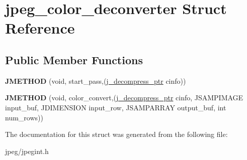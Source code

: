 \hypertarget{structjpeg__color__deconverter}{}\section{jpeg\+\_\+color\+\_\+deconverter Struct Reference}
\label{structjpeg__color__deconverter}
\subsection*{Public Member Functions}
\begin{DoxyCompactItemize}
\item 
{\bfseries J\+M\+E\+T\+H\+OD} (void, start\+\_\+pass,(\hyperlink{structjpeg__decompress__struct}{j\+\_\+decompress\+\_\+ptr} cinfo))\hypertarget{structjpeg__color__deconverter_a90ddfc502a2aadc44f157007a3e49056}{}\label{structjpeg__color__deconverter_a90ddfc502a2aadc44f157007a3e49056}

\item 
{\bfseries J\+M\+E\+T\+H\+OD} (void, color\+\_\+convert,(\hyperlink{structjpeg__decompress__struct}{j\+\_\+decompress\+\_\+ptr} cinfo, J\+S\+A\+M\+P\+I\+M\+A\+GE input\+\_\+buf, J\+D\+I\+M\+E\+N\+S\+I\+ON input\+\_\+row, J\+S\+A\+M\+P\+A\+R\+R\+AY output\+\_\+buf, int num\+\_\+rows))\hypertarget{structjpeg__color__deconverter_ab0fedad382d6b40b3698181271bb4ba4}{}\label{structjpeg__color__deconverter_ab0fedad382d6b40b3698181271bb4ba4}

\end{DoxyCompactItemize}


The documentation for this struct was generated from the following file\+:\begin{DoxyCompactItemize}
\item 
jpeg/jpegint.\+h\end{DoxyCompactItemize}
